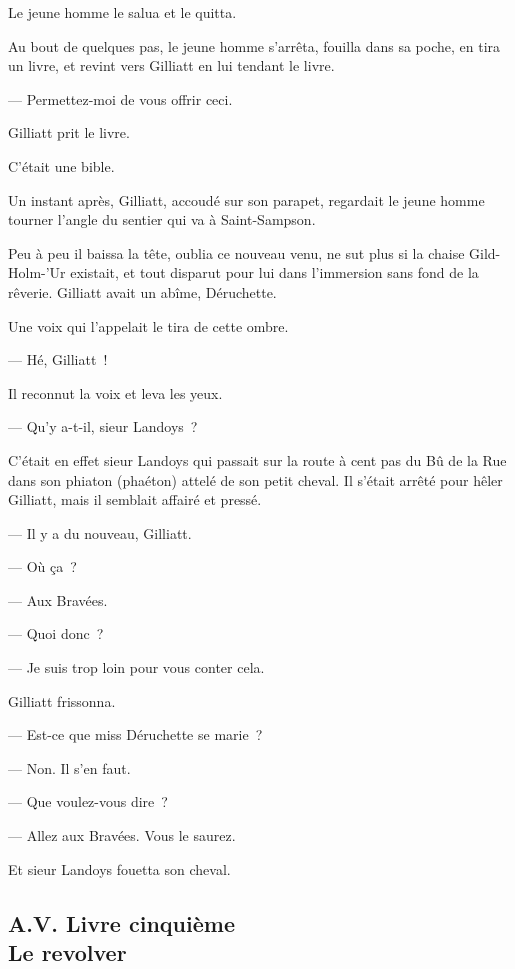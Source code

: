 \documentclass[french,twoside]{book} %
\begin{document}
Le jeune homme le salua et le quitta.\par
Au bout de quelques pas, le jeune homme s’arrêta, fouilla dans sa poche, en tira un livre, et revint vers Gilliatt en lui tendant le livre.\par
— Permettez-moi de vous offrir ceci.\par
Gilliatt prit le livre.\par
C’était une bible.\par
Un instant après, Gilliatt, accoudé sur son parapet, regardait le jeune homme tourner l’angle du sentier qui va à Saint-Sampson.\par
 Peu à peu il baissa la tête, oublia ce nouveau venu, ne sut plus si la chaise Gild-Holm-’Ur existait, et tout disparut pour lui dans l’immersion sans fond de la rêverie. Gilliatt avait un abîme, Déruchette.\par
Une voix qui l’appelait le tira de cette ombre.\par
— Hé, Gilliatt !\par
Il reconnut la voix et leva les yeux.\par
— Qu’y a-t-il, sieur Landoys ?\par
C’était en effet sieur Landoys qui passait sur la route à cent pas du Bû de la Rue dans son phiaton (phaéton) attelé de son petit cheval. Il s’était arrêté pour hêler Gilliatt, mais il semblait affairé et pressé.\par
— Il y a du nouveau, Gilliatt.\par
— Où ça ?\par
— Aux Bravées.\par
— Quoi donc ?\par
— Je suis trop loin pour vous conter cela.\par
Gilliatt frissonna.\par
— Est-ce que miss Déruchette se marie ?\par
— Non. Il s’en faut.\par
— Que voulez-vous dire ?\par
— Allez aux Bravées. Vous le saurez.\par
Et sieur Landoys fouetta son cheval.\par
  \subsection[{A.V. Livre cinquième. Le revolver}]{A.V. Livre cinquième \\
Le revolver}
\end{document}
